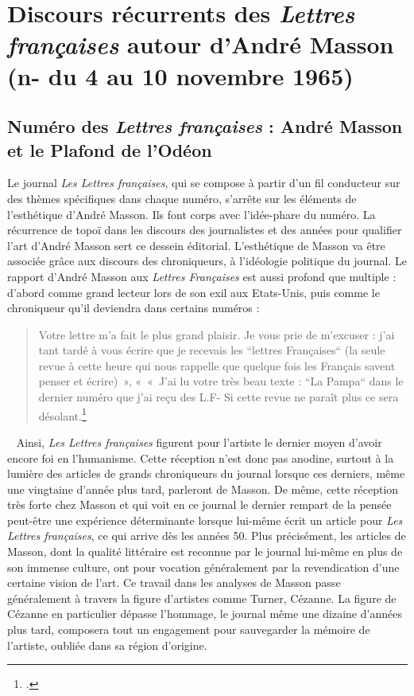 \section{Discours récurrents des \emph{Lettres françaises} autour d’André Masson (n- du 4 au 10 novembre 1965)}  

\subsection{Numéro des \emph{Lettres françaises} : André Masson et le Plafond de l'Odéon }


Le journal \emph{Les Lettres françaises}, qui se compose à partir d’un fil conducteur sur des thèmes spécifiques dans chaque numéro, s’arrête  sur les éléments de l’esthétique d’André Masson.  Ils font corps avec l’idée-phare du numéro.  La récurrence de topoï dans les discours des journalistes et des années pour qualifier l’art d’André Masson sert ce dessein éditorial. L’esthétique de Masson va être associée grâce aux discours des chroniqueurs, à l’idéologie politique du journal. Le rapport d’André Masson aux \emph{Lettres Françaises} est aussi profond que multiple : d’abord comme grand lecteur lors de son exil aux Etats-Unis, puis comme le chroniqueur qu'il deviendra dans certains numéros : 

\begin{quote}
Votre lettre m’a fait le plus grand plaisir. Je vous prie de m’excuser : j’ai tant tardé à vous écrire que je recevais les “lettres Françaises“ (la seule revue à cette heure qui nous rappelle que quelque fois les Français savent penser et écrire) », « « J’ai lu votre très beau texte : “La Pampa“ dans le dernier numéro que j’ai reçu des L.F- Si cette revue ne paraît plus ce sera désolant.\footcite[p478]{anneessurrealistes}\end{quote}
 
	Ainsi, \emph{Les Lettres françaises }figurent pour l’artiste le dernier moyen d’avoir encore foi en l’humanisme. Cette réception n’est donc pas anodine, surtout à la lumière des articles de grands chroniqueurs du journal lorsque ces derniers, même une vingtaine d’année plus tard, parleront de Masson. De même, cette réception très forte chez Masson et qui voit en ce journal le dernier rempart de la pensée peut-être une expérience déterminante lorsque lui-même écrit un article pour \emph{Les Lettres françaises}, ce qui arrive dès les années 50. Plus précisément, les articles de Masson, dont la qualité littéraire est reconnue par le journal lui-même en plus de son immense culture, ont pour vocation généralement par la revendication d’une certaine vision de l’art. Ce travail dans les analyses de Masson passe généralement à travers la figure d’artistes comme Turner, Cézanne. La figure de Cézanne en particulier dépasse l’hommage, le journal même une dizaine d’années plus tard, composera tout un engagement pour sauvegarder la mémoire de l’artiste, oubliée dans sa région d’origine. 


